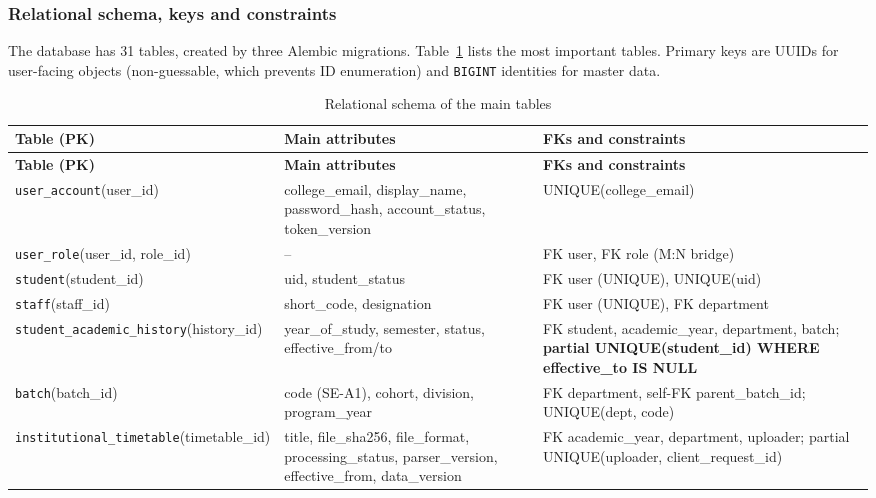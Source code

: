 \subsubsection{Relational schema, keys and constraints}
The database has 31 tables, created by three Alembic migrations. Table~\ref{tab:schema} lists the most
important tables. Primary keys are UUIDs for user-facing objects (non-guessable, which prevents ID
enumeration) and \texttt{BIGINT} identities for master data.

\begingroup\footnotesize
\begin{longtable}{@{}>{\raggedright\arraybackslash}p{4.0cm}>{\raggedright\arraybackslash}p{5.6cm}>{\raggedright\arraybackslash}p{5.6cm}@{}}
\caption{Relational schema of the main tables}\label{tab:schema}\\
\toprule
\textbf{Table (PK)} & \textbf{Main attributes} & \textbf{FKs and constraints}\\
\midrule
\endfirsthead
\toprule
\textbf{Table (PK)} & \textbf{Main attributes} & \textbf{FKs and constraints}\\
\midrule
\endhead
\texttt{user\_\allowbreak{}account}\newline(user\_id) & college\_email, display\_name, password\_hash, account\_status, token\_version & UNIQUE(college\_email)\\
\texttt{user\_\allowbreak{}role}\newline(user\_id, role\_id) & -- & FK user, FK role (M:N bridge)\\
\texttt{student}\newline(student\_id) & uid, student\_status & FK user (UNIQUE), UNIQUE(uid)\\
\texttt{staff}\newline(staff\_id) & short\_code, designation & FK user (UNIQUE), FK department\\
\texttt{student\_\allowbreak{}academic\_\allowbreak{}history}\newline(history\_id) & year\_of\_study, semester, status, effective\_from/to & FK student, academic\_year, department, batch; \textbf{partial UNIQUE(student\_id) WHERE effective\_to IS NULL}\\
\texttt{batch}\newline(batch\_id) & code (SE-A1), cohort, division, program\_year & FK department, self-FK parent\_batch\_id; UNIQUE(dept, code)\\
\texttt{institutional\_\allowbreak{}timetable}\newline(timetable\_id) & title, file\_sha256, file\_format, processing\_status, parser\_version, effective\_from, data\_version & FK academic\_year, department, uploader; partial UNIQUE(uploader, client\_request\_id)\\

\end{longtable}
